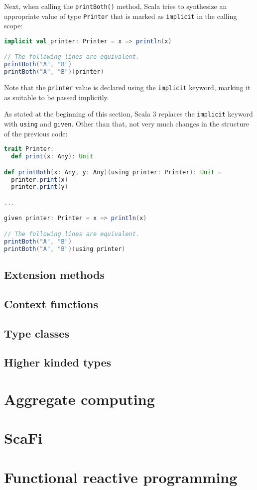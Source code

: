 Next, when calling the \texttt{printBoth()} method, Scala tries to synthesize an appropriate value of type \texttt{Printer} that is marked as \texttt{implicit} in the calling scope:
%
\begin{lstlisting}[frame=single, language=scala]
implicit val printer: Printer = x => println(x)

// The following lines are equivalent.
printBoth("A", "B")
printBoth("A", "B")(printer)
\end{lstlisting}
%
Note that the \texttt{printer} value is declared using the \texttt{implicit} keyword, marking it as suitable to be passed implicitly.

As stated at the beginning of this section, Scala 3 replaces the \texttt{implicit} keyword with \texttt{using} and \texttt{given}.
%
Other than that, not very much changes in the structure of the previous code:
%
\begin{lstlisting}[frame=single, language=scala]
trait Printer:
  def print(x: Any): Unit

def printBoth(x: Any, y: Any)(using printer: Printer): Unit =
  printer.print(x)
  printer.print(y)

...

given printer: Printer = x => println(x)

// The following lines are equivalent.
printBoth("A", "B")
printBoth("A", "B")(using printer)
\end{lstlisting}

\subsection{Extension methods}
\label{sec:extension-methods}



\subsection{Context functions}
\label{sec:context-functions}

\subsection{Type classes}
\label{sec:type-classes}

\subsection{Higher kinded types}

\section{Aggregate computing}

\section{ScaFi}

\section{Functional reactive programming}